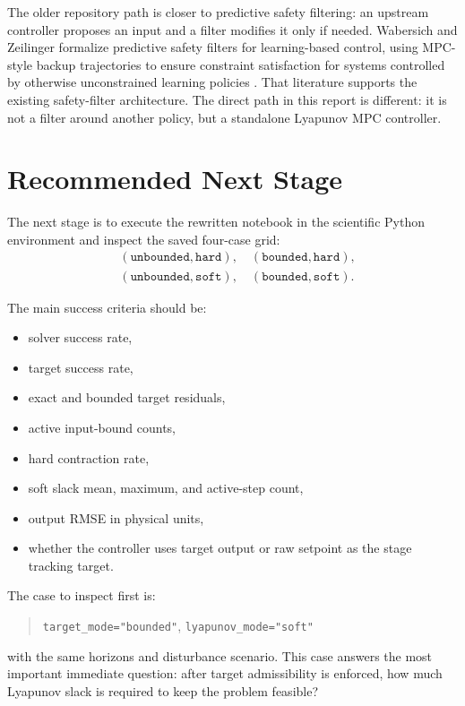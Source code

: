 \documentclass[11pt]{article}
\begin{document}
The older repository path is closer to predictive safety filtering: an upstream
controller proposes an input and a filter modifies it only if needed.
Wabersich and Zeilinger formalize predictive safety filters for learning-based
control, using MPC-style backup trajectories to ensure constraint satisfaction
for systems controlled by otherwise unconstrained learning policies
\cite{wabersich2021}. That literature supports the existing safety-filter
architecture. The direct path in this report is different: it is not a filter
around another policy, but a standalone Lyapunov MPC controller.

\section{Recommended Next Stage}

The next stage is to execute the rewritten notebook in the scientific Python
environment and inspect the saved four-case grid:
\begin{align}
&(\texttt{unbounded},\texttt{hard}),\quad
(\texttt{bounded},\texttt{hard}),\\
&(\texttt{unbounded},\texttt{soft}),\quad
(\texttt{bounded},\texttt{soft}).
\end{align}

The main success criteria should be:
\begin{itemize}[leftmargin=1.5em]
\item solver success rate,
\item target success rate,
\item exact and bounded target residuals,
\item active input-bound counts,
\item hard contraction rate,
\item soft slack mean, maximum, and active-step count,
\item output RMSE in physical units,
\item whether the controller uses target output or raw setpoint as the stage
tracking target.
\end{itemize}

The case to inspect first is:
\begin{quote}
\texttt{target\_mode="bounded"}, \texttt{lyapunov\_mode="soft"}
\end{quote}
with the same horizons and disturbance scenario. This case answers the most
important immediate question: after target admissibility is enforced, how much
Lyapunov slack is required to keep the problem feasible?
\end{document}
